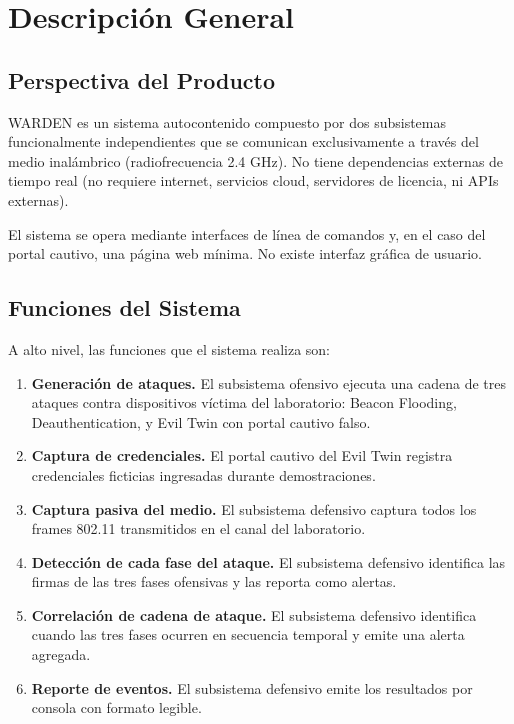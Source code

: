 \documentclass[11pt,a4paper]{article}
\begin{document}
\section{Descripción General}

\subsection{Perspectiva del Producto}
WARDEN es un sistema autocontenido compuesto por dos subsistemas
funcionalmente independientes que se comunican exclusivamente a través
del medio inalámbrico (radiofrecuencia 2.4 GHz). No tiene dependencias
externas de tiempo real (no requiere internet, servicios cloud,
servidores de licencia, ni APIs externas).

El sistema se opera mediante interfaces de línea de comandos y, en el
caso del portal cautivo, una página web mínima. No existe interfaz
gráfica de usuario.

\subsection{Funciones del Sistema}
A alto nivel, las funciones que el sistema realiza son:

\begin{enumerate}
  \item \textbf{Generación de ataques.} El subsistema ofensivo ejecuta
    una cadena de tres ataques contra dispositivos víctima del laboratorio:
    Beacon Flooding, Deauthentication, y Evil Twin con portal cautivo
    falso.
  \item \textbf{Captura de credenciales.} El portal cautivo del Evil Twin
    registra credenciales ficticias ingresadas durante demostraciones.
  \item \textbf{Captura pasiva del medio.} El subsistema defensivo
    captura todos los frames 802.11 transmitidos en el canal del
    laboratorio.
  \item \textbf{Detección de cada fase del ataque.} El subsistema
    defensivo identifica las firmas de las tres fases ofensivas y las
    reporta como alertas.
  \item \textbf{Correlación de cadena de ataque.} El subsistema defensivo
    identifica cuando las tres fases ocurren en secuencia temporal y
    emite una alerta agregada.
  \item \textbf{Reporte de eventos.} El subsistema defensivo emite los
    resultados por consola con formato legible.
\end{enumerate}
\end{document}
